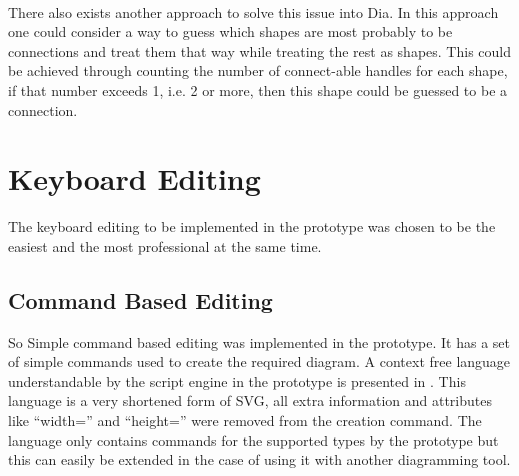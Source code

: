 \begin{itemize}
\paragraph{}
There also exists another approach to solve this issue into Dia. In this approach one could consider a way to guess which shapes are most probably to be connections and treat them that way while treating the rest as shapes. This could be achieved through counting the number of connect-able handles for each shape, if that number exceeds 1, i.e. 2 or more, then this shape could be guessed to be a connection.
\end{itemize}


\section{Keyboard Editing}
The keyboard editing to be implemented in the prototype was chosen to be the easiest and the most professional at the same time. 
\subsection* {Command Based Editing}
So Simple command based editing was implemented in the prototype. It has a set of simple commands used to create the required diagram. A context free language understandable by the script engine in the prototype is presented in . This language is a very shortened form of SVG, all extra information and attributes like ``width='' and ``height='' were removed from the creation command. The language only contains commands for the supported types by the prototype but this can easily be extended in the case of using it with another diagramming tool.

